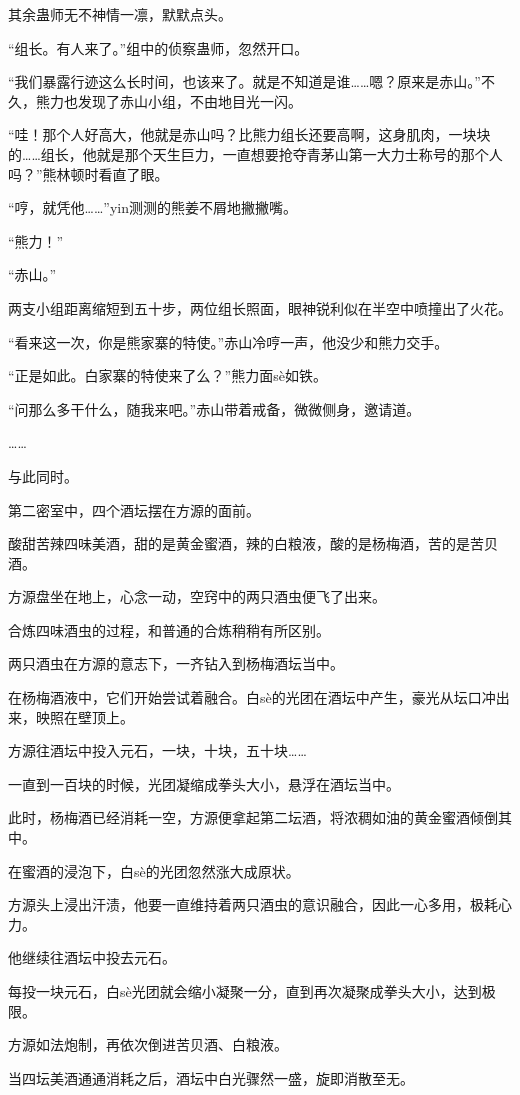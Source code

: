 \begin{this_body}
其余蛊师无不神情一凛，默默点头。

“组长。有人来了。”组中的侦察蛊师，忽然开口。

“我们暴露行迹这么长时间，也该来了。就是不知道是谁……嗯？原来是赤山。”不久，熊力也发现了赤山小组，不由地目光一闪。

“哇！那个人好高大，他就是赤山吗？比熊力组长还要高啊，这身肌肉，一块块的……组长，他就是那个天生巨力，一直想要抢夺青茅山第一大力士称号的那个人吗？”熊林顿时看直了眼。

“哼，就凭他……”yin测测的熊姜不屑地撇撇嘴。

“熊力！”

“赤山。”

两支小组距离缩短到五十步，两位组长照面，眼神锐利似在半空中喷撞出了火花。

“看来这一次，你是熊家寨的特使。”赤山冷哼一声，他没少和熊力交手。

“正是如此。白家寨的特使来了么？”熊力面sè如铁。

“问那么多干什么，随我来吧。”赤山带着戒备，微微侧身，邀请道。

……

与此同时。

第二密室中，四个酒坛摆在方源的面前。

酸甜苦辣四味美酒，甜的是黄金蜜酒，辣的白粮液，酸的是杨梅酒，苦的是苦贝酒。

方源盘坐在地上，心念一动，空窍中的两只酒虫便飞了出来。

合炼四味酒虫的过程，和普通的合炼稍稍有所区别。

两只酒虫在方源的意志下，一齐钻入到杨梅酒坛当中。

在杨梅酒液中，它们开始尝试着融合。白sè的光团在酒坛中产生，豪光从坛口冲出来，映照在壁顶上。

方源往酒坛中投入元石，一块，十块，五十块……

一直到一百块的时候，光团凝缩成拳头大小，悬浮在酒坛当中。

此时，杨梅酒已经消耗一空，方源便拿起第二坛酒，将浓稠如油的黄金蜜酒倾倒其中。

在蜜酒的浸泡下，白sè的光团忽然涨大成原状。

方源头上浸出汗渍，他要一直维持着两只酒虫的意识融合，因此一心多用，极耗心力。

他继续往酒坛中投去元石。

每投一块元石，白sè光团就会缩小凝聚一分，直到再次凝聚成拳头大小，达到极限。

方源如法炮制，再依次倒进苦贝酒、白粮液。

当四坛美酒通通消耗之后，酒坛中白光骤然一盛，旋即消散至无。


\end{this_body}
